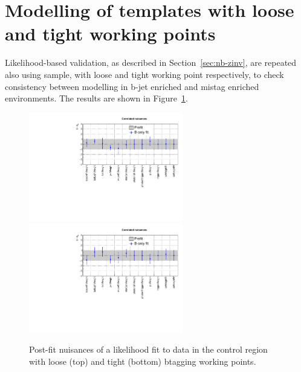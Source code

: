 
\section{Modelling of \texorpdfstring{\nb}{Nb} templates with loose and tight working points}
\label{sec:nb_validation}

Likelihood-based \nb validation, as described in Section~\ref{sec:nb-zinv}, are repeated also using \mmj sample, 
with loose and tight working point respectively, to check consistency between \nb modelling in b-jet enriched and 
mistag enriched environments. The results are shown in Figure~\ref{fig:loose_tight_nb}.

\begin{figure}[h!]
  \centering
  \includegraphics[width=0.6\textwidth]{figures/btag/nuisances/full/Correlated_nuisances_loose}
  \includegraphics[width=0.6\textwidth]{figures/btag/nuisances/full/Correlated_nuisances_tight}
  \caption{\label{fig:btagsfge1b} Post-fit nuisances of a likelihood
    fit to data in the \mmj control region with loose (top) and tight (bottom)
    btagging working points. }
  \label{fig:loose_tight_nb}
\end{figure}

